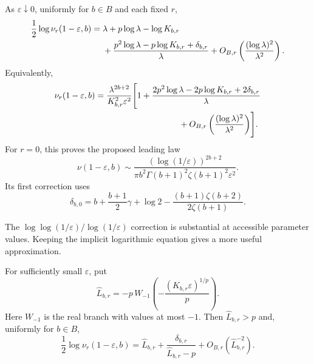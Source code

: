 \begin{theorem}
\label{eutrans:thm:crossing}
As $\varepsilon\downarrow0$, uniformly for $b\in B$ and each fixed $r$,
\begin{align}
 \frac12\log\nu_r(1-\varepsilon,b)
 ={}&\lambda+p\log\lambda-\log K_{b,r}\notag\\
 &+\frac{p^2\log\lambda-p\log K_{b,r}+\delta_{b,r}}{\lambda}
 +O_{B,r}\left(\frac{(\log\lambda)^2}{\lambda^2}\right).
 \label{eutrans:eq:Lroot}
\end{align}
Equivalently,
\begin{align}
 \nu_r(1-\varepsilon,b)
 ={}&\frac{\lambda^{2b+2}}{K_{b,r}^2\varepsilon^2}
 \Biggl[1+
 \frac{2p^2\log\lambda-2p\log K_{b,r}+2\delta_{b,r}}{\lambda}
 \notag\\
 &\hspace{30mm}+O_{B,r}\left(\frac{(\log\lambda)^2}{\lambda^2}\right)
 \Biggr].
 \label{eutrans:eq:nuroot}
\end{align}
For $r=0$, this proves the proposed leading law
\begin{equation}\label{eutrans:eq:conjecture}
 \nu(1-\varepsilon,b)\sim
 \frac{(\log(1/\varepsilon))^{2b+2}}
 {\pi b^2\Gamma(b+1)^2\zeta(b+1)^2\varepsilon^2}.
\end{equation}
Its first correction uses
\begin{equation}\label{eutrans:eq:delta0}
 \delta_{b,0}=b+\frac{b+1}{2}\gamma+\log2
                   -\frac{(b+1)\zeta(b+2)}{2\zeta(b+1)}.
\end{equation}
\end{theorem}

The $\log\log(1/\varepsilon)/\log(1/\varepsilon)$ correction is
substantial at accessible parameter values. Keeping the implicit
logarithmic equation gives a more useful approximation.

\begin{corollary}
\label{eutrans:cor:lambert}
For sufficiently small $\varepsilon$, put
\begin{equation}\label{eutrans:eq:Lambert}
 \widehat L_{b,r}=-p\,W_{-1}\left(
             -\frac{(K_{b,r}\varepsilon)^{1/p}}p\right).
\end{equation}
Here $W_{-1}$ is the real branch with values at most $-1$.
Then $\widehat L_{b,r}>p$ and, uniformly for $b\in B$,
\begin{equation}\label{eutrans:eq:Lambert-correction}
 \frac12\log\nu_r(1-\varepsilon,b)
 =\widehat L_{b,r}+
       \frac{\delta_{b,r}}{\widehat L_{b,r}-p}
       +O_{B,r}(\widehat L_{b,r}^{-2}).
\end{equation}
\end{corollary}

